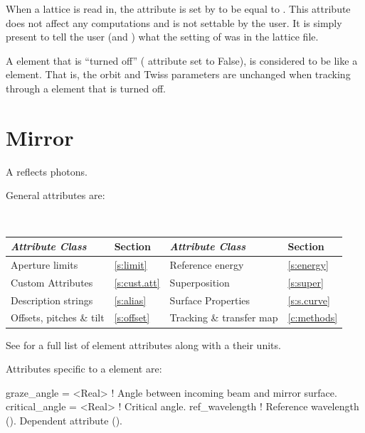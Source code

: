 {\begin{description}
When a lattice is read in, the  attribute is set by \bmad to be equal to
. This attribute does not affect any computations and is not settable by the
user. It is simply present to tell the user (and \bmad) what the setting of  was
in the lattice file.
  \end{description}

A  element that is ``turned off'' ( attribute set to False), is considered to be
like a  element. That is, the orbit and Twiss parameters are unchanged when tracking
through a  element that is turned off.

\section{Mirror}
\label{s:mirror}

A  reflects photons. 

General  attributes are:
\begin{center}
\tt 
\begin{tabular}{llll} \toprule
  {\sl Attribute Class}      & Section           & {\sl Attribute Class}      & Section         \\ \midrule
  Aperture limits            & \ref{s:limit}     & Reference energy           & \ref{s:energy}  \\
  Custom Attributes          & \ref{s:cust.att}  & Superposition              & \ref{s:super}   \\
  Description strings        & \ref{s:alias}     & Surface Properties         & \ref{s:s.curve} \\
  Offsets, pitches \& tilt   & \ref{s:offset}    & Tracking \& transfer map   & \ref{c:methods} \\ 
  \bottomrule
\end{tabular}
\end{center}
\toffset
See  for a full list of element attributes along with a their units.

Attributes specific to a  element are:
\begin{example}
  graze_angle     = <Real>   ! Angle between incoming beam and mirror surface.
  critical_angle  = <Real>   ! Critical angle.
  ref_wavelength             ! Reference wavelength (). Dependent attribute ().
\end{example}

}
